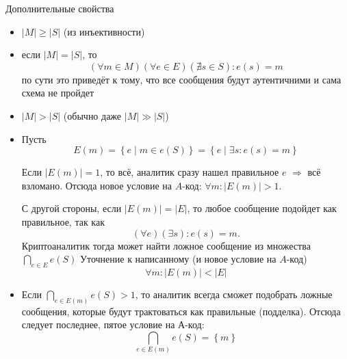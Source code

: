 Дополнительные свойства

\begin{itemize}
  \item
    $\left|M\right|{\geq}\left|S\right|$ (из инъективности)
  \item 
    если $\left|M\right|=\left|S\right|$, то 
    \begin{equation*}
       \left(\forall m \in M\right) \left(\forall e \in E\right)
       \left(\nexists s \in S\right): e\left(s\right)=m
    \end{equation*}
    по сути это приведёт к тому, что все сообщения будут аутентичними и
    сама схема не пройдет
  \item
    $\left|M\right|>\left|S\right|$ (обычно даже
    $\left|M\right|{\gg}\left|S\right|$)
  \item
    Пусть
    \begin{equation*}
      E\left( m \right)
      = \left\{e \mid m \in e\left(S\right)\right\}
      =\left\{e \mid \exists s:e\left(s\right)
      =m\right\}
    \end{equation*}

    Если  $\left|E(m)\right|=1$, то всё, аналитик сразу нашел правильное $e$
    $\Rightarrow $ всё взломано.
    Отсюда новое условие на $A$-код: 
    ${\forall}m:\left|E\left(m\right)\right|>1$.

    С другой стороны, если  $\left|E\left(m\right)\right|=\left|E\right|$,
    то любое сообщение подойдет как правильное, так как
    \begin{equation*}
      \left(\forall e\right)\left(\exists s\right):e\left(s\right)=m.
    \end{equation*}
    Криптоаналитик тогда может найти ложное сообщение из множества
    $\bigcap\limits_{e{\in}E}e\left( S \right)$ 
    Уточнение к написанному (и новое условие на $A$-код) 
    \begin{equation*}
      {\forall}m:\left|E\left( m \right)\right|<\left|E\right|
    \end{equation*}
  \item
    Если $\bigcap\limits_{e{\in}E\left( m \right)} e\left( S \right) > 1$,
    то аналитик всегда сможет подобрать ложные сообщения, которые будут
    трактоваться как правильные (подделка).
    Отсюда следует последнее, пятое условие на А-код:
    \begin{equation*}
      \bigcap\limits_{e{\in}E\left( m \right)}e\left( S \right)
      = \left\{ m \right\}
    \end{equation*}
\end{itemize}

